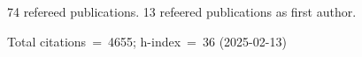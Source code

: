 74 refereed publications. 13 refeered publications as first author.

Total citations~=~4655; h-index~=~36 (2025-02-13)